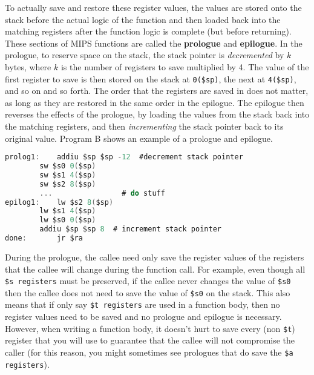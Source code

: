 \documentclass{article}
\begin{document}
To actually save and restore these register values, the values are stored onto the stack before the actual logic of the function and then loaded back into the matching registers after the function logic is complete (but before returning). These sections of MIPS functions are called the \textbf{prologue} and \textbf{epilogue}. In the prologue, to reserve space on the stack, the stack pointer is \textit{decremented} by $k$ bytes, where $k$ is the number of registers to save multiplied by 4. The value of the first register to save is then stored on the stack at \texttt{0(\$sp)}, the next at \texttt{4(\$sp)}, and so on and so forth. The order that the registers are saved in does not matter, as long as they are restored in the same order in the epilogue. The epilogue then reverses the effects of the prologue, by loading the values from the stack back into the matching registers, and then \textit{incrementing} the stack pointer back to its original value. Program B shows an example of a prologue and epilogue.
\begin{center}
\renewcommand{\ttdefault}{pcr}
\begin{lstlisting}[language=C, basicstyle=\ttfamily, keywordstyle=\bfseries, showstringspaces=false, morekeywords={jal, addu, move, bne, j, sw, addiu, lw, jr}]
prolog1:  	addiu $sp $sp -12  #decrement stack pointer
		sw $s0 0($sp)
		sw $s1 4($sp)
		sw $s2 8($sp)
		... 			   # do stuff
epilog1:	lw $s2 8($sp)
		lw $s1 4($sp)
		lw $s0 0($sp)
		addiu $sp $sp 8  # increment stack pointer
done:		jr $ra 
\end{lstlisting}
\end{center}
During the prologue, the callee need only save the register values of the registers that the callee will change during the function call. For example, even though all \texttt{\$s registers} must be preserved, if the callee never changes the value of \texttt{\$s0} then the callee does not need to save the value of \texttt{\$s0} on the stack. This also means that if only say \texttt{\$t registers} are used in a function body, then no register values need to be saved and no prologue and epilogue is necessary. However, when writing a function body, it doesn't hurt to save every (non \texttt{\$t}) register that you will use to guarantee that the callee will not compromise the caller (for this reason, you might sometimes see prologues that do save the \texttt{\$a registers}).
\end{document}
